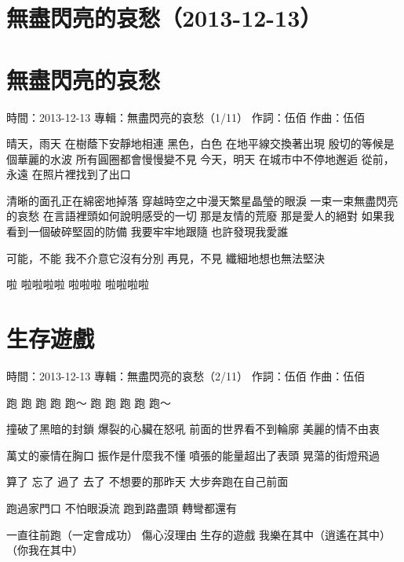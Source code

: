 \documentclass[UTF8,a4paper,oneside,twocolumn,12pt]{ctexbook}
\newcommand{\infopair}[2]{\textbullet #1：#2}
\newcommand{\zc}[1][伍佰]{\infopair{作詞}{#1}}
\newcommand{\zq}[1][伍佰]{\infopair{作曲}{#1}}
\newcommand{\zj}[1]{\infopair{專輯}{#1}}
\newcommand{\sj}[1]{\infopair{時間}{#1}}
\newenvironment{info}{\begin{flushleft}\kaishu
	}
	{\end{flushleft}\normalsize\yahei\par}
\newenvironment{lyric}{
	}
{}
\begin{document}
\section*{無盡閃亮的哀愁（2013-12-13）}
\section{無盡閃亮的哀愁}
\begin{info}
	\sj{2013-12-13}
	\zj{無盡閃亮的哀愁（1/11）}
	\zc
	\zq
\end{info}
\begin{lyric}
	晴天，雨天  在樹蔭下安靜地相連
	黑色，白色  在地平線交換著出現
	殷切的等候是個華麗的水波   所有圓圈都會慢慢變不見
	今天，明天   在城市中不停地邂逅
	從前，永遠   在照片裡找到了出口

	清晰的面孔正在綿密地掉落
	穿越時空之中漫天繁星晶瑩的眼淚
	一束一束無盡閃亮的哀愁
	在言語裡頭如何說明感受的一切
	那是友情的荒廢
	那是愛人的絕對
	如果我看到一個破碎堅固的防備
	我要牢牢地跟隨
	也許發現我愛誰

	可能，不能
	我不介意它沒有分別
	再見，不見
	纖細地想也無法堅決

	啦 啦啦啦啦 啦啦啦 啦啦啦啦
\end{lyric}

\section{生存遊戲}
\begin{info}
	\sj{2013-12-13}
	\zj{無盡閃亮的哀愁（2/11）}
	\zc
	\zq
\end{info}
\begin{lyric}
	跑 跑 跑 跑 跑～
	跑 跑 跑 跑 跑～

	撞破了黑暗的封鎖
	爆裂的心臟在怒吼
	前面的世界看不到輪廓
	美麗的情不由衷

	萬丈的豪情在胸口
	振作是什麼我不懂
	噴張的能量超出了表頭
	晃蕩的街燈飛過

	算了 忘了 過了 去了 不想要的那昨天
	大步奔跑在自己前面

	跑過家門口 不怕眼淚流
	跑到路盡頭 轉彎都還有

	一直往前跑（一定會成功） 傷心沒理由
	生存的遊戲 我樂在其中（逍遙在其中）（你我在其中）
\end{lyric}
\end{document}
